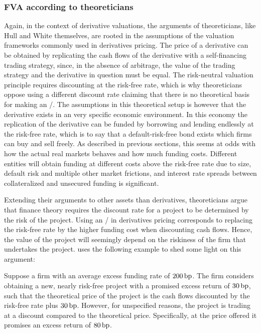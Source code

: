 \documentclass[../../../main.tex]{subfiles}
\begin{document}
        \subsubsection{FVA according to theoreticians}
            Again, in the context of derivative valuations, 
            the arguments of theoreticians, like Hull and White themselves, 
            are rooted in the assumptions of the valuation frameworks commonly used in derivatives pricing.
            The price of a derivative can be obtained by replicating the cash flows of the derivative 
            with a self-financing trading strategy, since, in the absence of arbitrage, 
            the value of the trading strategy and the derivative in question must be equal.
            The risk-neutral valuation principle requires discounting at the risk-free rate,
            which is why theoreticians oppose using a different discount rate
            claiming that there is no theoretical basis for making an \FVA/.
            The assumptions in this theoretical setup is however 
            that the derivative exists in an very specific economic environment. 
            In this economy the replication of the derivative
            can be funded by borrowing and lending endlessly at the risk-free rate,
            which is to say that a default-risk-free bond exists which firms can buy and sell freely.
            As described in previous sections,
            this seems at odds with how the actual real markets behaves and how much funding costs.
            Different entities will obtain funding at different costs above the risk-free rate due to size,
            default risk and multiple other market frictions,
            and interest rate spreads between collateralized and unsecured funding is significant.

            Extending their arguments to other assets than derivatives, 
            theoreticians argue that finance theory requires the discount rate for a project 
            to be determined by the risk of the project.
            Using an \FVA/ in derivatives pricing corresponds to replacing the risk-free rate by the higher funding cost
            when discounting cash flows.
            Hence, the value of the project will seemingly depend on the riskiness of the firm that undertakes the project.
            \textcite{HullWhite2012FVA} uses the following example to shed some light on this argument:

            Suppose a firm with an average excess funding rate of $200\,\text{bp}$. 
            The firm considers obtaining a new, nearly risk-free project with a promised excess return of $30\,\text{bp}$,
            such that the theoretical price of the project is the cash flows 
            discounted by the risk-free rate plus $30\,\text{bp}$.
            However, for unspecified reasons, the project is trading at a discount compared to the theoretical price.
            Specifically, at the price offered it promises an excess return of $80\,\text{bp}$.
            
\end{document}
